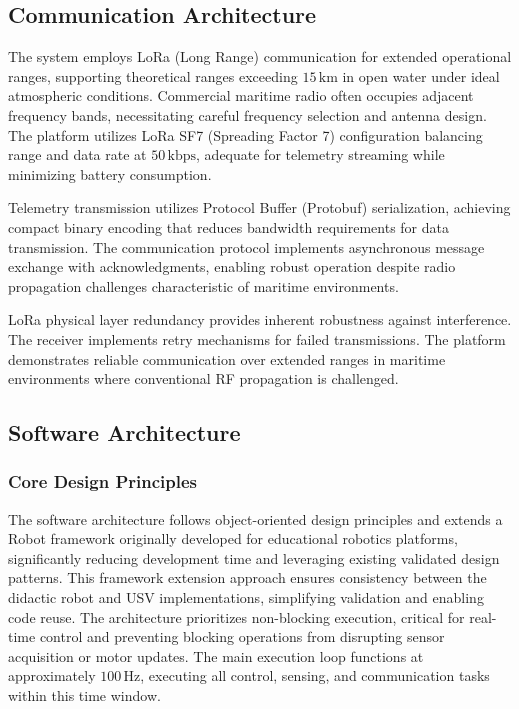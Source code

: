 \documentclass[conference]{IEEEtran}
\begin{document}
\subsection{Communication Architecture}
The system employs LoRa (Long Range) communication for extended operational ranges, supporting theoretical ranges exceeding $15 \, \mathrm{km}$ in open water under ideal atmospheric conditions. Commercial maritime radio often occupies adjacent frequency bands, necessitating careful frequency selection and antenna design. The platform utilizes LoRa SF7 (Spreading Factor 7) configuration balancing range and data rate at $50 \, \mathrm{kbps}$, adequate for telemetry streaming while minimizing battery consumption.

Telemetry transmission utilizes Protocol Buffer (Protobuf) serialization, achieving compact binary encoding that reduces bandwidth requirements for data transmission. The communication protocol implements asynchronous message exchange with acknowledgments, enabling robust operation despite radio propagation challenges characteristic of maritime environments.

LoRa physical layer redundancy provides inherent robustness against interference. The receiver implements retry mechanisms for failed transmissions. The platform demonstrates reliable communication over extended ranges in maritime environments where conventional RF propagation is challenged.

\subsection{Software Architecture}
\subsubsection{Core Design Principles}
The software architecture follows object-oriented design principles and extends a Robot framework originally developed for educational robotics platforms, significantly reducing development time and leveraging existing validated design patterns. This framework extension approach ensures consistency between the didactic robot and USV implementations, simplifying validation and enabling code reuse. The architecture prioritizes non-blocking execution, critical for real-time control and preventing blocking operations from disrupting sensor acquisition or motor updates. The main execution loop functions at approximately $100 \, \mathrm{Hz}$, executing all control, sensing, and communication tasks within this time window.
\end{document}
